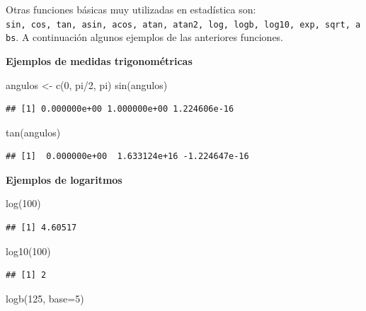 \documentclass[
]{book}
\makeatletter
\newenvironment{Shaded}{\begin{snugshade}}{\end{snugshade}}
\newcommand{\AttributeTok}[1]{\textcolor[rgb]{0.77,0.63,0.00}{#1}}
\newcommand{\DecValTok}[1]{\textcolor[rgb]{0.00,0.00,0.81}{#1}}
\newcommand{\FunctionTok}[1]{\textcolor[rgb]{0.00,0.00,0.00}{#1}}
\newcommand{\NormalTok}[1]{#1}
\newcommand{\OtherTok}[1]{\textcolor[rgb]{0.56,0.35,0.01}{#1}}
\newcommand{\SpecialCharTok}[1]{\textcolor[rgb]{0.00,0.00,0.00}{#1}}
\newenvironment{kframe}{%
\medskip{}
\setlength{\fboxsep}{.8em}
 \def\at@end@of@kframe{}%
 \ifinner\ifhmode%
  \def\at@end@of@kframe{\end{minipage}}%
  \begin{minipage}{\columnwidth}%
 \fi\fi%
 \def\FrameCommand##1{\hskip\@totalleftmargin \hskip-\fboxsep
 \colorbox{shadecolor}{##1}\hskip-\fboxsep
     \hskip-\linewidth \hskip-\@totalleftmargin \hskip\columnwidth}%
 \MakeFramed {\advance\hsize-\width
   \@totalleftmargin\z@ \linewidth\hsize
   \@setminipage}}%
 {\par\unskip\endMakeFramed%
 \at@end@of@kframe}
\renewenvironment{Shaded}{\begin{kframe}}{\end{kframe}}
\makeatother
\begin{document}
Otras funciones básicas muy utilizadas en estadística son: \texttt{sin,\ cos,\ tan,\ asin,\ acos,\ atan,\ atan2,\ log,\ logb,\ log10,\ exp,\ sqrt,\ abs}. A continuación algunos ejemplos de las anteriores funciones.

\textbf{Ejemplos de medidas trigonométricas}

\begin{Shaded}
\begin{Highlighting}[]
\NormalTok{angulos }\OtherTok{\textless{}{-}} \FunctionTok{c}\NormalTok{(}\DecValTok{0}\NormalTok{, pi}\SpecialCharTok{/}\DecValTok{2}\NormalTok{, pi)}
\FunctionTok{sin}\NormalTok{(angulos)}
\end{Highlighting}
\end{Shaded}

\begin{verbatim}
## [1] 0.000000e+00 1.000000e+00 1.224606e-16
\end{verbatim}

\begin{Shaded}
\begin{Highlighting}[]
\FunctionTok{tan}\NormalTok{(angulos)}
\end{Highlighting}
\end{Shaded}

\begin{verbatim}
## [1]  0.000000e+00  1.633124e+16 -1.224647e-16
\end{verbatim}

\textbf{Ejemplos de logaritmos}

\begin{Shaded}
\begin{Highlighting}[]
\FunctionTok{log}\NormalTok{(}\DecValTok{100}\NormalTok{)}
\end{Highlighting}
\end{Shaded}

\begin{verbatim}
## [1] 4.60517
\end{verbatim}

\begin{Shaded}
\begin{Highlighting}[]
\FunctionTok{log10}\NormalTok{(}\DecValTok{100}\NormalTok{)}
\end{Highlighting}
\end{Shaded}

\begin{verbatim}
## [1] 2
\end{verbatim}

\begin{Shaded}
\begin{Highlighting}[]
\FunctionTok{logb}\NormalTok{(}\DecValTok{125}\NormalTok{, }\AttributeTok{base=}\DecValTok{5}\NormalTok{)}
\end{Highlighting}
\end{Shaded}
\end{document}
